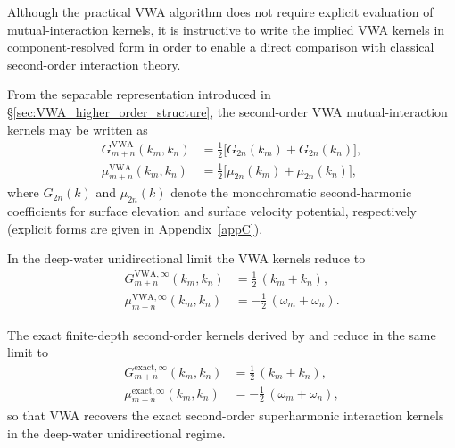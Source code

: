 \documentclass[lineno]{JFM-FLM_Au}
\begin{document}
Although the practical VWA algorithm does not require explicit evaluation of mutual-interaction kernels, it is instructive to write the implied VWA kernels in component-resolved form in order to enable a direct comparison with classical second-order interaction theory.


From the separable representation introduced in \S\ref{sec:VWA_higher_order_structure}, the second-order VWA mutual-interaction kernels may be written as
\begin{subequations}
\label{eq:2ndVWA-kernels-clean}
\begin{align}
G_{m+n}^{\mathrm{VWA}}(k_m,k_n)
&=
\frac12
\Big[
G_{2n}(k_m)
+
G_{2n}(k_n)
\Big],
\\[2mm]
\mu_{m+n}^{\mathrm{VWA}}(k_m,k_n)
&=
\frac12
\Big[
\mu_{2n}(k_m)
+
\mu_{2n}(k_n)
\Big],
\end{align}
\end{subequations}
where $G_{2n}(k)$ and $\mu_{2n}(k)$ denote the monochromatic second-harmonic coefficients for surface elevation and surface velocity potential, respectively (explicit forms are given in Appendix~\ref{appC}).


In the deep-water unidirectional limit the VWA kernels reduce to
\begin{subequations}
\label{eq:2ndVWA-kernels-deep-clean}
\begin{align}
G_{m+n}^{\mathrm{VWA},\infty}(k_m,k_n)
&=
\frac12\,(k_m+k_n),
\\[2mm]
\mu_{m+n}^{\mathrm{VWA},\infty}(k_m,k_n)
&=
-\frac12\,(\omega_m+\omega_n).
\end{align}
\end{subequations}

The exact finite-depth second-order kernels derived by \citet{dalzell1999note} and \citet{madsen2012third} reduce in the same limit to
\begin{subequations}
\label{eq:2ndExact-kernels-deep-clean}
\begin{align}
G_{m+n}^{\mathrm{exact},\infty}(k_m,k_n)
&=
\frac12\,(k_m+k_n),
\\[2mm]
\mu_{m+n}^{\mathrm{exact},\infty}(k_m,k_n)
&=
-\frac12\,(\omega_m+\omega_n),
\end{align}
\end{subequations}
so that VWA recovers the exact second-order superharmonic interaction kernels in the deep-water unidirectional regime.
\end{document}
